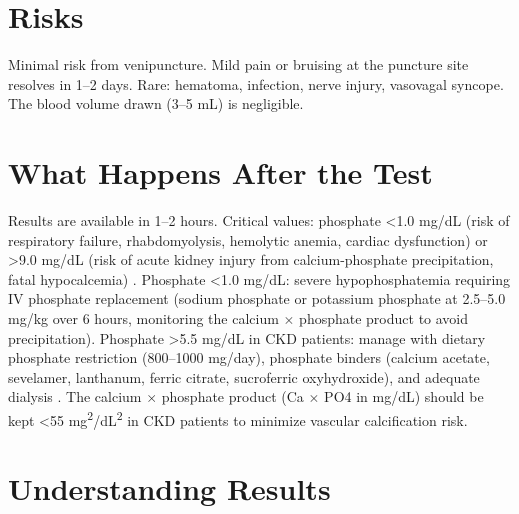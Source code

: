 \section*{Risks}
Minimal risk from venipuncture. Mild pain or bruising at the puncture site resolves in 1--2 days. Rare: hematoma, infection, nerve injury, vasovagal syncope. The blood volume drawn (3--5 mL) is negligible.

\section*{What Happens After the Test}
Results are available in 1--2 hours. Critical values: phosphate <1.0 mg/dL (risk of respiratory failure, rhabdomyolysis, hemolytic anemia, cardiac dysfunction) or >9.0 mg/dL (risk of acute kidney injury from calcium-phosphate precipitation, fatal hypocalcemia) \cite{wallach2022interpretation}. Phosphate <1.0 mg/dL: severe hypophosphatemia requiring IV phosphate replacement (sodium phosphate or potassium phosphate at 2.5--5.0 mg/kg over 6 hours, monitoring the calcium $\times$ phosphate product to avoid precipitation). Phosphate >5.5 mg/dL in CKD patients: manage with dietary phosphate restriction (800--1000 mg/day), phosphate binders (calcium acetate, sevelamer, lanthanum, ferric citrate, sucroferric oxyhydroxide), and adequate dialysis \cite{shaman2016hyperphosphatemia}. The calcium $\times$ phosphate product (Ca $\times$ PO4 in mg/dL) should be kept <55 mg\textsuperscript{2}/dL\textsuperscript{2} in CKD patients to minimize vascular calcification risk.

\section*{Understanding Results}

